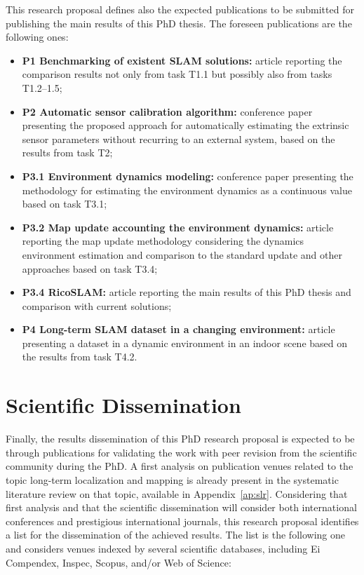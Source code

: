 This research proposal defines also the expected publications to be submitted for publishing the main results of this PhD thesis. The foreseen publications are the following ones:

\begin{itemize}[nosep]
\item \textbf{P1 Benchmarking of existent \gls{SLAM} solutions:} article reporting the comparison results not only from task T1.1 but possibly also from tasks T1.2--1.5;
\item \textbf{P2 Automatic sensor calibration algorithm:} conference paper presenting the proposed approach for automatically estimating the extrinsic sensor parameters without recurring to an external system, based on the results from task T2;
\item \textbf{P3.1 Environment dynamics modeling:} conference paper presenting the methodology for estimating the environment dynamics as a continuous value based on task T3.1;
\item \textbf{P3.2 Map update accounting the environment dynamics:} article reporting the map update methodology considering the dynamics environment estimation and comparison to the standard update and other approaches based on task T3.4;
\item \textbf{P3.4 RicoSLAM:} article reporting the main results of this PhD thesis and comparison with current solutions;
\item \textbf{P4 Long-term \gls{SLAM} dataset in a changing environment:} article presenting a dataset in a dynamic environment in an indoor scene based on the results from task T4.2.
\end{itemize}






\section{Scientific Dissemination}\label{sec:dissemination}

Finally, the results dissemination of this PhD research proposal is expected to be through publications for validating the work with peer revision from the scientific community during the PhD.
A first analysis on publication venues related to the topic long-term localization and mapping is already present in the systematic literature review on that topic, available in Appendix~\ref{ap:slr}.
Considering that first analysis and that the scientific dissemination will consider both international conferences and prestigious international journals, this research proposal identifies a list for the dissemination of the achieved results. The list is the following one and considers venues indexed by several scientific databases, including Ei Compendex, Inspec, Scopus, and/or Web of Science:

